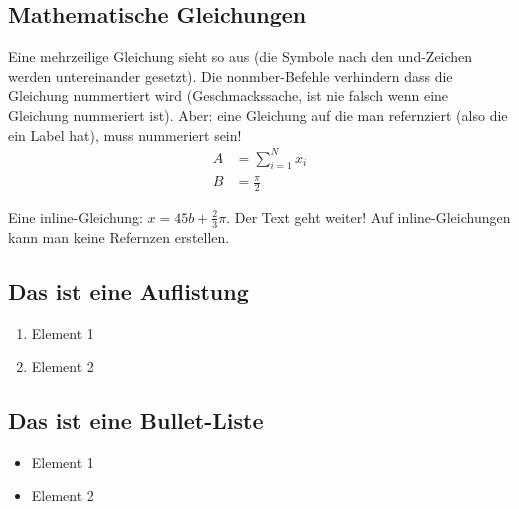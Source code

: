 \documentclass[12pt,oneside]{article}
\begin{document}
\subsection{Mathematische Gleichungen}
Eine mehrzeilige Gleichung sieht so aus (die Symbole nach den und-Zeichen werden untereinander gesetzt). Die nonmber-Befehle verhindern dass die Gleichung nummertiert wird (Geschmackssache, ist nie falsch wenn eine Gleichung nummeriert ist). Aber: eine Gleichung auf die man refernziert (also die ein Label hat), muss nummeriert sein!
\begin{align}
    A &= \sum_{i=1}^N x_i \label{eq:1}\nonumber\\
    B &= \frac{\pi}{2}
\end{align}

Eine inline-Gleichung: $x=45b + \frac{2}{3}\pi$. Der Text geht weiter! Auf inline-Gleichungen kann man keine Refernzen erstellen.

\subsection{Das ist eine Auflistung}
\begin{enumerate}
\item Element 1
\item Element 2
\end{enumerate}

\subsection{Das ist eine Bullet-Liste}
\begin{itemize}
\item Element 1
\item Element 2
\end{itemize}
\end{document}
